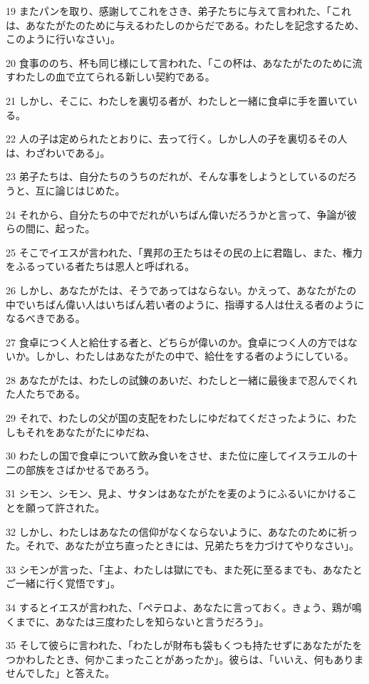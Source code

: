 \par 19 またパンを取り、感謝してこれをさき、弟子たちに与えて言われた、「これは、あなたがたのために与えるわたしのからだである。わたしを記念するため、このように行いなさい」。
\par 20 食事ののち、杯も同じ様にして言われた、「この杯は、あなたがたのために流すわたしの血で立てられる新しい契約である。
\par 21 しかし、そこに、わたしを裏切る者が、わたしと一緒に食卓に手を置いている。
\par 22 人の子は定められたとおりに、去って行く。しかし人の子を裏切るその人は、わざわいである」。
\par 23 弟子たちは、自分たちのうちのだれが、そんな事をしようとしているのだろうと、互に論じはじめた。
\par 24 それから、自分たちの中でだれがいちばん偉いだろうかと言って、争論が彼らの間に、起った。
\par 25 そこでイエスが言われた、「異邦の王たちはその民の上に君臨し、また、権力をふるっている者たちは恩人と呼ばれる。
\par 26 しかし、あなたがたは、そうであってはならない。かえって、あなたがたの中でいちばん偉い人はいちばん若い者のように、指導する人は仕える者のようになるべきである。
\par 27 食卓につく人と給仕する者と、どちらが偉いのか。食卓につく人の方ではないか。しかし、わたしはあなたがたの中で、給仕をする者のようにしている。
\par 28 あなたがたは、わたしの試錬のあいだ、わたしと一緒に最後まで忍んでくれた人たちである。
\par 29 それで、わたしの父が国の支配をわたしにゆだねてくださったように、わたしもそれをあなたがたにゆだね、
\par 30 わたしの国で食卓について飲み食いをさせ、また位に座してイスラエルの十二の部族をさばかせるであろう。
\par 31 シモン、シモン、見よ、サタンはあなたがたを麦のようにふるいにかけることを願って許された。
\par 32 しかし、わたしはあなたの信仰がなくならないように、あなたのために祈った。それで、あなたが立ち直ったときには、兄弟たちを力づけてやりなさい」。
\par 33 シモンが言った、「主よ、わたしは獄にでも、また死に至るまでも、あなたとご一緒に行く覚悟です」。
\par 34 するとイエスが言われた、「ペテロよ、あなたに言っておく。きょう、鶏が鳴くまでに、あなたは三度わたしを知らないと言うだろう」。
\par 35 そして彼らに言われた、「わたしが財布も袋もくつも持たせずにあなたがたをつかわしたとき、何かこまったことがあったか」。彼らは、「いいえ、何もありませんでした」と答えた。
